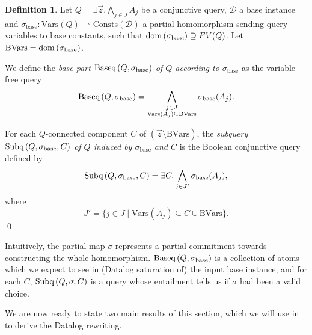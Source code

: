 \documentclass[12pt]{report}
\theoremstyle{plain}
\theoremstyle{definition}
\newtheorem{definition}[theorem]{Definition}
\def\Vars{{\mathrm{Vars}}}
\def\Consts{{\mathrm{Consts}}}
\newcommand{\dom}[1]{\ensuremath{\normalfont{\operatorname{dom}} \left( #1 \right)}}
\newcommand{\Subq}[3]{\ensuremath{\normalfont{\textrm{Subq}} \left( #1, #2, #3 \right)}}
\newcommand{\Baseq}[2]{\ensuremath{\normalfont{\textrm{Baseq}} \left( #1, #2 \right)}}
\begin{document}
\begin{definition}
  Let $Q = \exists \vec{z}. \bigwedge_{j \in J} A_j$ be a conjunctive query, $\mathcal{D}$ a base instance and $\sigma_\mathrm{base}: \Vars(Q) \rightharpoonup \Consts(\mathcal{D})$ a partial homomorphism sending query variables to base constants, such that $\dom{\sigma_\mathrm{base}} \supseteq FV(Q)$. Let $\mathrm{BVars} = \dom{\sigma_\mathrm{base}}$.

  We define the \emph{base part $\Baseq{Q}{\sigma_\mathrm{base}}$ of $Q$ according to $\sigma_\mathrm{base}$} as the variable-free query
  $$\Baseq{Q}{\sigma_\mathrm{base}} = \bigwedge_{\substack{j \in J \\ \Vars(A_j) \subseteq \mathrm{BVars}}} \sigma_\mathrm{base}(A_j).$$

  For each $Q$-connected component $C$ of $(\vec{z} \setminus \mathrm{BVars})$, the \emph{subquery $\Subq{Q}{\sigma_\mathrm{base}}{C}$ of $Q$ induced by $\sigma_\mathrm{base}$ and $C$} is the Boolean conjunctive query defined by
  $$\Subq{Q}{\sigma_\mathrm{base}}{C} = \exists C. \bigwedge_{j \in J'} \sigma_\mathrm{base}(A_j),$$
  where $$J' = \{ j \in J \mid \Vars(A_j) \subseteq C \cup \mathrm{BVars} \}.$$
  \qed
\end{definition}

Intuitively, the partial map $\sigma$ represents a partial commitment towards constructing the whole homomorphism. $\Baseq{Q}{\sigma_\mathrm{base}}$ is a collection of atoms which we expect to see in (Datalog saturation of) the input base instance, and for each $C$, $\Subq{Q}{\sigma}{C}$ is a query whose entailment tells us if $\sigma$ had been a valid choice.

We are now ready to state two main results of this section, which we will use in  to derive the Datalog rewriting.

\newpage
\end{document}
